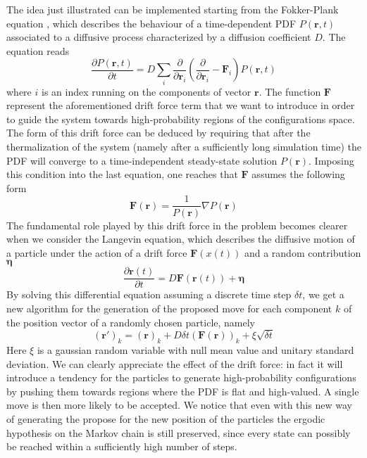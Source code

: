 The idea just illustrated can be implemented starting from the Fokker-Plank equation \cite{lectures2015}, which describes the behaviour of a time-dependent PDF $P(\bm{r}, t)$ associated to a diffusive process characterized by a diffusion coefficient $D$. The equation reads
\begin{equation*}
    \frac{\partial P(\bm{r}, t)}{\partial t} = D \sum_i \frac{\partial}{\partial \bm{r}_i} \left( \frac{\partial}{\partial \bm{r}_i} - \bm{F}_i \right) P(\bm{r}, t)
\end{equation*}
where $i$ is an index running on the components of vector $\bm{r}$. The function $\bm{F}$ represent the aforementioned drift force term that we want to introduce in order to guide the system towards high-probability regions of the configurations space. The form of this drift force can be deduced by requiring that after the thermalization of the system (namely after a sufficiently long simulation time) the PDF will converge to a time-independent steady-state solution $P(\bm{r})$. Imposing this condition into the last equation, one reaches that $\bm{F}$ assumes the following form
\begin{equation*}
    \bm{F}(\bm{r}) = \frac{1}{P(\bm{r})} \nabla P(\bm{r})
\end{equation*}
The fundamental role played by this drift force in the problem becomes clearer when we consider the Langevin equation, which describes the diffusive motion of a particle under the action of a drift force $\bm{F}(x(t))$ and a random contribution $\bm{\eta}$ 
\begin{equation*}
    \frac{\partial \bm{r}(t)}{\partial t} = D \bm{F}(\bm{r}(t)) + \bm{\eta}  
\end{equation*}
By solving this differential equation assuming a discrete time step $\delta t$, we get a new algorithm for the generation of the proposed move for each component $k$ of the position vector of a randomly chosen particle, namely
\begin{equation}
    (\bm{r}')_k = (\bm{r})_k + D\delta t  (\bm{F}(\bm{r}))_k+ \xi \sqrt{\delta t}
    \label{new_position_importance}
\end{equation}
Here $\xi$ is a gaussian random variable with null mean value and unitary standard deviation. We can clearly appreciate the effect of the drift force: in fact it will introduce a tendency for the particles to generate high-probability configurations by pushing them towards regions where the PDF is flat and high-valued. A single move is then more likely to be accepted. We notice that even with this new way of generating the propose for the new position of the particles the ergodic hypothesis on the Markov chain is still preserved, since every state can possibly be reached within a sufficiently high number of steps. 

